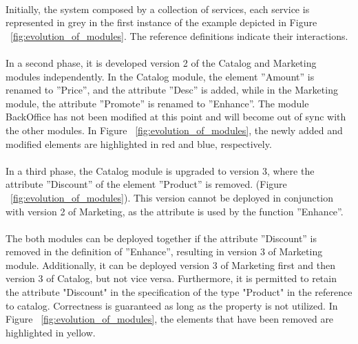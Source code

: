 \paragraph{}

Initially, the system composed by a collection of services,
each service is represented in grey in the first instance of the example depicted in Figure ~\ref{fig:evolution_of_modules}.
The reference definitions indicate their interactions.

\paragraph{}

In a second phase, it is developed version 2 of the Catalog and Marketing modules independently.
In the Catalog module, the element ''Amount'' is renamed to ''Price'', and the attribute ''Desc'' is added, while in the Marketing module,
the attribute ''Promote'' is renamed to ''Enhance''.
The module BackOffice has not been modified at this point and will become out of sync with the other modules.
In Figure ~\ref{fig:evolution_of_modules}, the newly added and modified elements are highlighted in red and blue, respectively.

\paragraph{}

In a third phase, the Catalog module is upgraded to version 3, where the attribute ''Discount'' of the element ''Product'' is removed.  (Figure ~\ref{fig:evolution_of_modules}).
This version cannot be deployed in conjunction with version 2 of Marketing, as the attribute is used by the function ''Enhance''.

\paragraph{}

The both modules can be deployed together if the attribute ''Discount'' is removed in the definition of ''Enhance'', resulting in version 3 of Marketing module.
Additionally, it can be deployed version 3 of Marketing first and then version 3 of Catalog, but not vice versa.
Furthermore, it is permitted to retain the attribute "Discount" in the specification of the type "Product" in the reference to catalog.
Correctness is guaranteed as long as the property is not utilized.
In Figure ~\ref{fig:evolution_of_modules}, the elements that have been removed are highlighted in yellow.

